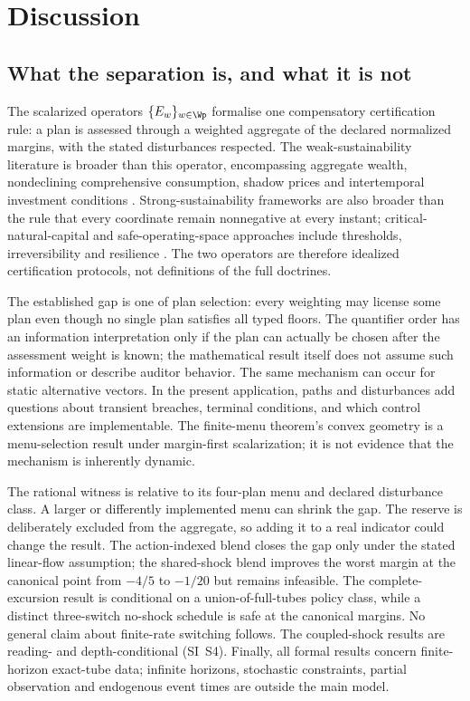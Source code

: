 \section{Discussion}\label{sec:discussion}

\subsection{What the separation is, and what it is not}\label{sec:scope}

The scalarized operators $\{E_w\}_{w\in\Wp}$ formalise one compensatory certification rule: a plan is assessed through a weighted aggregate of the declared normalized margins, with the stated disturbances respected. The weak-sustainability literature is broader than this operator, encompassing aggregate wealth, nondeclining comprehensive consumption, shadow prices and intertemporal investment conditions \citep{Solow1974,Asheim1994,DasguptaMaler2000,Neumayer2013}. Strong-sustainability frameworks are also broader than the rule that every coordinate remain nonnegative at every instant; critical-natural-capital and safe-operating-space approaches include thresholds, irreversibility and resilience \citep{Ekins2003,Rockstrom2009,Raworth2012,DoyenGajardo2020}. The two operators are therefore idealized certification protocols, not definitions of the full doctrines.

The established gap is one of plan selection: every weighting may license some plan even though no single plan satisfies all typed floors. The quantifier order has an information interpretation only if the plan can actually be chosen after the assessment weight is known; the mathematical result itself does not assume such information or describe auditor behavior. The same mechanism can occur for static alternative vectors. In the present application, paths and disturbances add questions about transient breaches, terminal conditions, and which control extensions are implementable. The finite-menu theorem's convex geometry is a menu-selection result under margin-first scalarization; it is not evidence that the mechanism is inherently dynamic.

The rational witness is relative to its four-plan menu and declared disturbance class. A larger or differently implemented menu can shrink the gap. The reserve is deliberately excluded from the aggregate, so adding it to a real indicator could change the result. The action-indexed blend closes the gap only under the stated linear-flow assumption; the shared-shock blend improves the worst margin at the canonical point from $-4/5$ to $-1/20$ but remains infeasible. The complete-excursion result is conditional on a union-of-full-tubes policy class, while a distinct three-switch no-shock schedule is safe at the canonical margins. No general claim about finite-rate switching follows. The coupled-shock results are reading- and depth-conditional (SI~S4). Finally, all formal results concern finite-horizon exact-tube data; infinite horizons, stochastic constraints, partial observation and endogenous event times are outside the main model.

